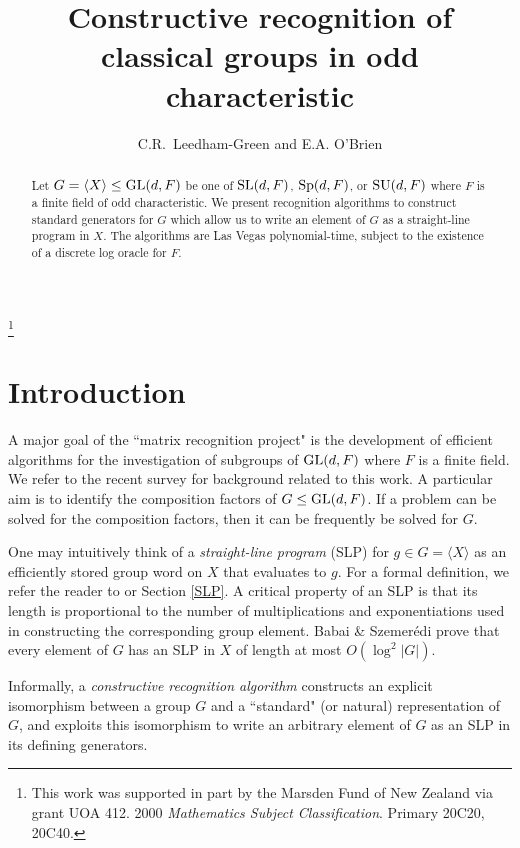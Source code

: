 \documentclass[12pt]{article}
\def\SL{{\rm SL}}
\def\GL{{\rm GL}}
\def\Sp{{\rm Sp}}
\def\SU{{\rm SU}}
\begin{document}
\title{Constructive recognition of classical groups in odd characteristic} 
\author{C.R.\ Leedham-Green and E.A. O'Brien}
\date{}
\maketitle

\begin{abstract}
Let $G = \langle X \rangle \leq \GL(d, F)$ be 
one of $\SL (d, F)$, $\Sp (d, F)$, or $\SU (d, F)$
where $F$ is a finite field of odd characteristic. 
We present recognition algorithms to construct
standard generators for $G$ which allow us
to write an element of $G$ as a straight-line
program in $X$.
The algorithms are Las Vegas polynomial-time, 
subject to the existence of a discrete log oracle for $F$. 
\end{abstract}

\footnote{This work was supported in part by the Marsden Fund of
New Zealand via grant UOA 412.
2000 {\it Mathematics Subject Classification}.
Primary 20C20, 20C40.}

\section{Introduction}
\label{intro}

A major goal of the ``matrix recognition project"
is the development of efficient
algorithms for the investigation of 
subgroups of $\GL(d, F)$ where $F$ 
is a finite field. 
We refer to the recent survey \cite{OBrien05}
for background related to this work.
A particular aim is to 
identify the composition factors
of $G \leq \GL(d, F)$. If a problem
can be solved for the composition factors,
then it can be frequently be solved for $G$.

One may intuitively think of a {\it straight-line program} (SLP)
for $g \in G = \langle X \rangle$ as an efficiently stored group word
on $X$ that evaluates to $g$.  For a formal definition, we
refer the reader to \cite[p.\ 10]{Seress03} or  
Section \ref{SLP}.
A critical property of an SLP is 
that its length is proportional to the number of 
multiplications and exponentiations used in
constructing the corresponding group element. 
Babai \& Szemer{\'e}di \cite{BabaiSzemeredi84}
prove that every element of 
$G$ has an SLP in $X$ of length at most $O(\log^2|G|)$.

Informally, a {\it constructive recognition algorithm}
constructs an explicit isomorphism
between a group $G$ and a ``standard" (or natural)
representation of $G$, and exploits this isomorphism
to write an arbitrary element of $G$ as
an SLP in its defining generators. 
\end{document}
